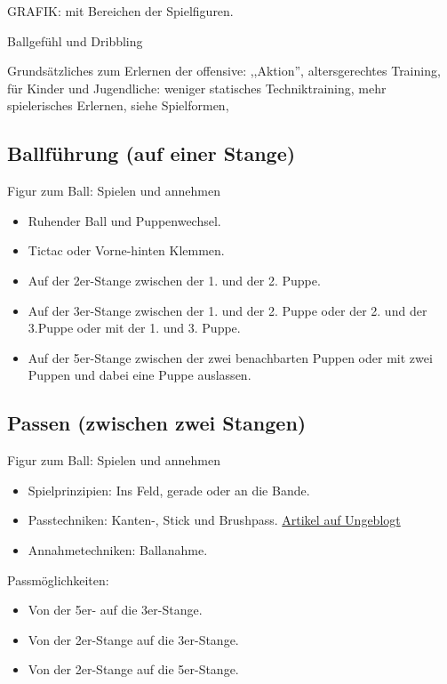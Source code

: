GRAFIK: mit Bereichen der Spielfiguren.

Ballgefühl und Dribbling

Grundsätzliches zum Erlernen der \gls{offensive}: ,,Aktion'', altersgerechtes Training,  für Kinder und Jugendliche: weniger statisches Techniktraining, mehr spielerisches Erlernen, siehe Spielformen,


\subsection{Ballführung (auf einer Stange)} 
\label{technik:offensive:eine}

Figur zum Ball: Spielen und annehmen

\begin{itemize}
\item Ruhender Ball und Puppenwechsel.
\item Tictac oder Vorne-hinten Klemmen.
\item Auf der 2er-Stange zwischen der 1. und der 2. Puppe.
\item Auf der 3er-Stange zwischen der 1. und der 2. Puppe oder der 2. und der 3.Puppe oder mit der 1. und 3. Puppe.
\item Auf der 5er-Stange zwischen der zwei benachbarten Puppen oder mit zwei Puppen und dabei eine Puppe auslassen.
\end{itemize}


\subsection{Passen (zwischen zwei Stangen)}
\label{technik:offensive:zwei}

Figur zum Ball: Spielen und annehmen

\begin{itemize}
\item Spielprinzipien: Ins Feld, gerade oder an die Bande.
\item Passtechniken: Kanten-, Stick und Brushpass. 
\href{http://ungeblogtkickern.blogspot.de/2015/09/schrag-schieen.html}{Artikel auf Ungeblogt}
\item Annahmetechniken: Ballanahme.
\end{itemize}

Passmöglichkeiten:
\begin{itemize}
\item Von der 5er- auf die 3er-Stange.
\item Von der 2er-Stange auf die 3er-Stange.
\item Von der 2er-Stange auf die 5er-Stange.
\end{itemize}


